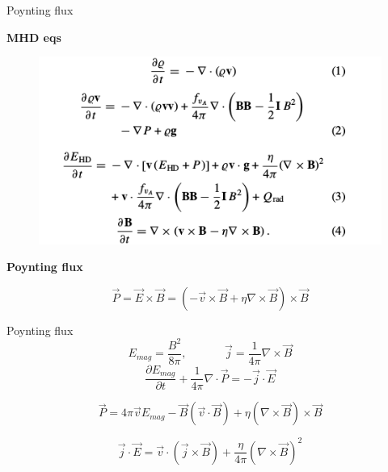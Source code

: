 \documentclass{beamer}
\begin{document}
\newcommand{\tikzAngleOfLine}{\tikz@AngleOfLine}
  \def\tikz@AngleOfLine(#1)(#2)#3{%
  \pgfmathanglebetweenpoints{%
    \pgfpointanchor{#1}{center}}{%
    \pgfpointanchor{#2}{center}}
  \pgfmathsetmacro{#3}{\pgfmathresult}%
  }



\begin{frame}{Poynting flux}

\bf{MHD eqs} 
 
\begin{figure}[H]
 \centering
 \includegraphics[scale=0.5]{eqs.png}
\end{figure}

\bf{Poynting flux} 

\begin{equation}
\vec{P} =  \vec{E} \times \vec{B}   =  (- \vec{v} \times \vec{B}  + \eta \nabla \times \vec{B}) \times \vec{B}
\end{equation}

\end{frame}

\begin{frame}{Poynting flux}
\begin{equation}
E_{mag} = \frac{B^2}{8 \pi} , \;\;\;\; \;\;\;\; \;\;\;\;  \vec{j} = \frac{1}{4 \pi} \nabla \times \vec{B}
\end{equation}
\begin{equation}
\frac{\partial E_{mag}}{\partial t} + \frac{1}{4 \pi} \nabla \cdot \vec{P} = -\vec{j} \cdot \vec{E}
\end{equation}

\begin{equation}
\vec{P} =  4 \pi \vec{v} E_{mag} -  \vec{B}(\vec{v} \cdot \vec{B}) + 
  \eta (  \nabla \times \vec{B})  \times \vec{B} 
\end{equation}


\begin{equation}
\vec{j} \cdot \vec{E} = \vec{v} \cdot \left( \vec{j} \times \vec{B} \right) + \frac{\eta}{4 \pi} \left ( \nabla \times \vec{B} \right )^2
\end{equation}

\end{frame}
\end{document}
